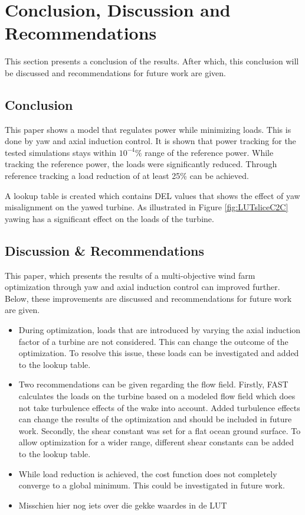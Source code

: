 \section{Conclusion, Discussion and Recommendations}
This section presents a conclusion of the results. After which, this conclusion will be discussed and recommendations for future work are given. 
\subsection{Conclusion}
This paper shows a model that regulates power while minimizing loads. This is done by yaw and axial induction control. It is shown that power tracking for the tested simulations stays within $10^{-4}\%$ range of the reference power. While tracking the reference power, the loads were significantly reduced.
Through reference tracking a load reduction of at least 25\% can be achieved.
 
A lookup table is created which contains DEL values that shows the effect of yaw misalignment on the yawed turbine. As illustrated in Figure \ref{fig:LUTsliceC2C} yawing has a significant effect on the loads of the turbine.


 

\subsection{Discussion \& Recommendations}
This paper, which presents the results of a multi-objective wind farm optimization through yaw and axial induction control can improved further. Below, these improvements are discussed and recommendations for future work are given.
\begin{itemize}
	\item During optimization, loads that are introduced by varying the axial induction factor of a turbine are not considered. This can change the outcome of the optimization. To resolve this issue, these loads can be investigated and added to the lookup table.
	\item Two recommendations can be given regarding the flow field. Firstly, FAST calculates the loads on the turbine based on a modeled flow field which does not take turbulence effects of the wake into account. Added turbulence effects can change the results of the optimization and should be included in future work. Secondly, the shear constant was set for a flat ocean ground surface. To allow optimization for a wider range, different shear constants can be added to the lookup table.
	\item While load reduction is achieved, the cost function does not completely converge to a global minimum. This could be investigated in future work.
	\item Misschien hier nog iets over die gekke waardes in de LUT
\end{itemize}

